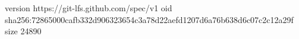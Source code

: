 version https://git-lfs.github.com/spec/v1
oid sha256:72865000cafb332d906323654c3a78d22aefd1207d6a76b638d6c07c2c12a29f
size 24890
